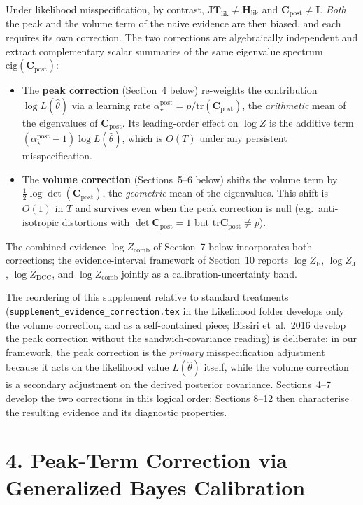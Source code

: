 \documentclass[11pt]{article}
\begin{document}
Under likelihood misspecification, by contrast,
$\mathbf{JT}_{\mathrm{lik}} \neq \mathbf H_{\mathrm{lik}}$ and
$\mathbf C_{\mathrm{post}} \neq \mathbf I$. \emph{Both} the peak and the
volume term of the naive evidence are then biased, and each requires its
own correction. The two corrections are algebraically independent and
extract complementary scalar summaries of the same eigenvalue spectrum
$\mathrm{eig}(\mathbf C_{\mathrm{post}})$:
\begin{itemize}
\item The \textbf{peak correction} (Section~4 below) re-weights the
contribution $\log L(\hat\theta)$ via a learning rate
$\alpha_\star^{\mathrm{post}} = p / \mathrm{tr}(\mathbf C_{\mathrm{post}})$,
the \emph{arithmetic} mean of the eigenvalues of $\mathbf C_{\mathrm{post}}$.
Its leading-order effect on $\log Z$ is the additive term
$(\alpha_\star^{\mathrm{post}}-1)\log L(\hat\theta)$, which is $O(T)$ under
any persistent misspecification.
\item The \textbf{volume correction} (Sections~5--6 below) shifts the volume
term by $\tfrac{1}{2}\log\det(\mathbf C_{\mathrm{post}})$, the \emph{geometric}
mean of the eigenvalues. This shift is $O(1)$ in $T$ and survives even when
the peak correction is null (e.g.\ anti-isotropic distortions with
$\det \mathbf C_{\mathrm{post}} = 1$ but $\mathrm{tr}\mathbf C_{\mathrm{post}}
\neq p$).
\end{itemize}
The combined evidence $\log Z_{\mathrm{comb}}$ of Section~7 below
incorporates both corrections; the evidence-interval framework of
Section~10 reports $\log Z_{\mathrm{F}}$, $\log Z_{\mathrm{J}}$,
$\log Z_{\mathrm{DCC}}$, and $\log Z_{\mathrm{comb}}$ jointly as a
calibration-uncertainty band.

The reordering of this supplement relative to standard treatments
(\texttt{supplement\_evidence\_correction.tex} in the Likelihood folder
develops only the volume correction, and as a self-contained piece;
Bissiri et~al.\ 2016 develop the peak correction without the
sandwich-covariance reading) is deliberate: in our framework, the peak
correction is the \emph{primary} misspecification adjustment because it
acts on the likelihood value $L(\hat\theta)$ itself, while the volume
correction is a secondary adjustment on the derived posterior covariance.
Sections~4--7 develop the two corrections in this logical order; Sections
8--12 then characterise the resulting evidence and its diagnostic
properties.


\section*{4. Peak-Term Correction via Generalized Bayes Calibration}
\end{document}
